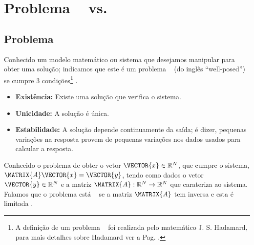 \section{Problema \wellposed~ vs. \illposed }

\subsection{Problema \wellposed}
\begin{definition}
\label{def:bem-posto:1}
Conhecido um modelo matemático ou sistema que desejamos manipular para obter uma solução;
indicamos que este é um problema \wellposed~ (do inglês ``well-posed'') 
se cumpre 3 condições\footnote{A definição de um problema \wellposed~ foi realizada pelo matemático J. S. Hadamard, 
para mais detalhes sobre Hadamard ver a Pag. \pageref{elab:Hadamard}.} \cite[pp. 16]{gockenbach2016linear}
\cite[pp. 6]{p2011well}.
\begin{itemize}
\item \textbf{Existência:} Existe uma solução que verifica o sistema.
\item \textbf{Unicidade:} A solução é única.
\item \textbf{Estabilidade:} A solução depende continuamente da saída;
é dizer, pequenas variações na resposta provem de pequenas variações nos dados usados para calcular a resposta.
\end{itemize}
\end{definition}

\begin{example}
Conhecido o problema de obter o vetor $\VECTOR{x} \in \mathbb{R}^{N}$,
que cumpre o sistema, $\MATRIX{A}\VECTOR{x}=\VECTOR{y}$,
 tendo como dados o vetor $\VECTOR{y} \in \mathbb{R}^{N}$ e 
a matriz $\MATRIX{A}: \mathbb{R}^{N} \rightarrow \mathbb{R}^{N}$ que carateriza ao sistema.
Falamos que o problema está \wellposed~ se a matriz $\MATRIX{A}$ tem inversa e esta é limitada \cite[pp. 18]{gockenbach2016linear}. 
\end{example}

